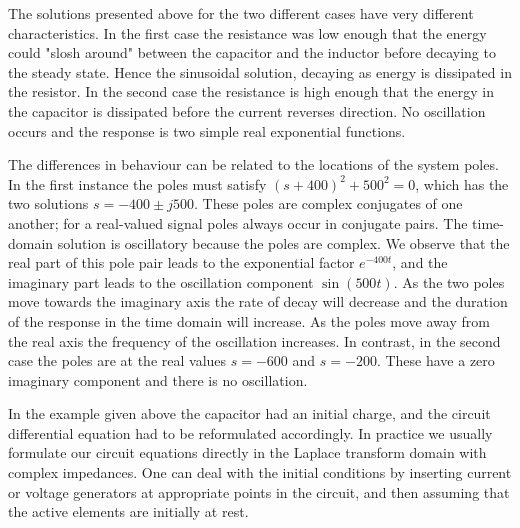 \documentclass[10pt]{beamer}
\begin{document}
The solutions presented above for the two different cases have very different characteristics.  In the first case the resistance was low enough that the energy could "slosh around" between the capacitor and the inductor before decaying to the steady state.  Hence the sinusoidal solution, decaying as energy is dissipated in the resistor.  In the second case the resistance is high enough that the energy in the capacitor is dissipated before the current reverses direction.  No oscillation occurs and the response is two simple real exponential functions.

The differences in behaviour can be related to the locations of the system poles.  In the first instance the poles must satisfy $(s+400)^2 + 500^2 = 0$, which has the two solutions $s = -400 \pm j 500$.  These poles are complex conjugates of one another; for a real-valued signal poles always occur in conjugate pairs.  The time-domain solution is oscillatory because the poles are complex.  We observe that the real part of this pole pair leads to the exponential factor $e^{-400 t}$, and the imaginary part leads to the oscillation component $\sin(500 t)$.  As the two poles move towards the imaginary axis the rate of decay will decrease and the duration of the response in the time domain will increase.  As the poles move away from the real axis the frequency of the oscillation increases.  In contrast, in the second case the poles are at the real values $s=-600$ and $s=-200$.  These have a zero imaginary component and there is no oscillation.

In the example given above the capacitor had an initial charge, and the circuit differential equation had to be reformulated accordingly.  In practice we usually formulate our circuit equations directly in the Laplace transform domain with complex impedances.  One can deal with the initial conditions by inserting current or voltage generators at appropriate points in the circuit, and then assuming that the active elements are initially at rest.
\end{document}
